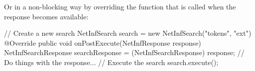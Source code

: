 Or in a non-blocking way by overriding the function that is called when the response becomes available:

\begin{code}[language=Java]
	// Create a new search
	NetInfSearch search = new NetInfSearch("tokens", "ext") {
            @Override
            public void onPostExecute(NetInfResponse response) {
                NetInfSearchResponse searchResponse =
                        (NetInfSearchResponse) response;
				// Do things with the response...
            }
    }
    // Execute the search
	search.execute();
\end{code}